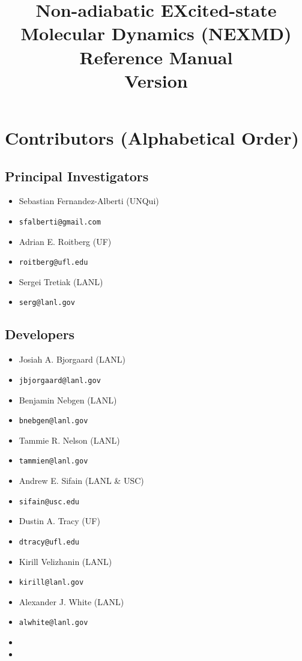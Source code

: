 \documentclass[letterpaper,12pt,titlepage]{article}
\title{Non-adiabatic EXcited-state Molecular Dynamics (NEXMD) Reference Manual\\ Version \versionnumber}
\author{}
\date{}
\begin{document}
\maketitle
\tableofcontents
\newpage

\section{Contributors (Alphabetical Order)}
\subsection{Principal Investigators}
\begin{itemize}
\item Sebastian Fernandez-Alberti (UNQui)
\item[] \vspace*{-.75em}\verb+sfalberti@gmail.com+
\item Adrian E. Roitberg (UF)
\item[] \vspace*{-.75em}\verb+roitberg@ufl.edu+
\item Sergei Tretiak (LANL)
\item[] \vspace*{-.75em}\verb+serg@lanl.gov+
\end{itemize}
\subsection{Developers}
\begin{multicols}{2}
\begin{itemize}
\item Josiah A. Bjorgaard (LANL)
\item[] \vspace*{-.75em}\verb+jbjorgaard@lanl.gov+
\item Benjamin Nebgen (LANL)
\item[] \vspace*{-.75em}\verb+bnebgen@lanl.gov+
\item Tammie R. Nelson (LANL)
\item[] \vspace*{-.75em}\verb+tammien@lanl.gov+
\item Andrew E. Sifain (LANL \& USC)
\item[] \vspace*{-.75em}\verb+sifain@usc.edu+
\item Dustin A. Tracy (UF)
\item[] \vspace*{-.75em}\verb+dtracy@ufl.edu+
\item Kirill Velizhanin (LANL)
\item[] \vspace*{-.75em}\verb+kirill@lanl.gov+
\item Alexander J. White (LANL)
\item[] \vspace*{-.75em}\verb+alwhite@lanl.gov+
\item[]
\item[]
\end{itemize}
\end{multicols}
\end{document}
